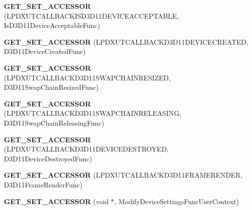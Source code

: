 \begin{DoxyCompactItemize}
\item 
\hypertarget{class_d_x_u_t_state_a4775782896fcfa945881eff26445830c}{{\bfseries G\+E\+T\+\_\+\+S\+E\+T\+\_\+\+A\+C\+C\+E\+S\+S\+O\+R} (L\+P\+D\+X\+U\+T\+C\+A\+L\+L\+B\+A\+C\+K\+I\+S\+D3\+D11\+D\+E\+V\+I\+C\+E\+A\+C\+C\+E\+P\+T\+A\+B\+L\+E, Is\+D3\+D11\+Device\+Acceptable\+Func)}\label{class_d_x_u_t_state_a4775782896fcfa945881eff26445830c}

\item 
\hypertarget{class_d_x_u_t_state_a305bd5b6f340358d358eb1ba0136b784}{{\bfseries G\+E\+T\+\_\+\+S\+E\+T\+\_\+\+A\+C\+C\+E\+S\+S\+O\+R} (L\+P\+D\+X\+U\+T\+C\+A\+L\+L\+B\+A\+C\+K\+D3\+D11\+D\+E\+V\+I\+C\+E\+C\+R\+E\+A\+T\+E\+D, D3\+D11\+Device\+Created\+Func)}\label{class_d_x_u_t_state_a305bd5b6f340358d358eb1ba0136b784}

\item 
\hypertarget{class_d_x_u_t_state_aa3917d0ad7c1d620158a0b9a5430c794}{{\bfseries G\+E\+T\+\_\+\+S\+E\+T\+\_\+\+A\+C\+C\+E\+S\+S\+O\+R} (L\+P\+D\+X\+U\+T\+C\+A\+L\+L\+B\+A\+C\+K\+D3\+D11\+S\+W\+A\+P\+C\+H\+A\+I\+N\+R\+E\+S\+I\+Z\+E\+D, D3\+D11\+Swap\+Chain\+Resized\+Func)}\label{class_d_x_u_t_state_aa3917d0ad7c1d620158a0b9a5430c794}

\item 
\hypertarget{class_d_x_u_t_state_a01d21b3d56f85cd0accb4727c5272405}{{\bfseries G\+E\+T\+\_\+\+S\+E\+T\+\_\+\+A\+C\+C\+E\+S\+S\+O\+R} (L\+P\+D\+X\+U\+T\+C\+A\+L\+L\+B\+A\+C\+K\+D3\+D11\+S\+W\+A\+P\+C\+H\+A\+I\+N\+R\+E\+L\+E\+A\+S\+I\+N\+G, D3\+D11\+Swap\+Chain\+Releasing\+Func)}\label{class_d_x_u_t_state_a01d21b3d56f85cd0accb4727c5272405}

\item 
\hypertarget{class_d_x_u_t_state_aaf058c9c904ee8328a3c7308cebdd977}{{\bfseries G\+E\+T\+\_\+\+S\+E\+T\+\_\+\+A\+C\+C\+E\+S\+S\+O\+R} (L\+P\+D\+X\+U\+T\+C\+A\+L\+L\+B\+A\+C\+K\+D3\+D11\+D\+E\+V\+I\+C\+E\+D\+E\+S\+T\+R\+O\+Y\+E\+D, D3\+D11\+Device\+Destroyed\+Func)}\label{class_d_x_u_t_state_aaf058c9c904ee8328a3c7308cebdd977}

\item 
\hypertarget{class_d_x_u_t_state_a79452c9869b633e792be85665a99a9ec}{{\bfseries G\+E\+T\+\_\+\+S\+E\+T\+\_\+\+A\+C\+C\+E\+S\+S\+O\+R} (L\+P\+D\+X\+U\+T\+C\+A\+L\+L\+B\+A\+C\+K\+D3\+D11\+F\+R\+A\+M\+E\+R\+E\+N\+D\+E\+R, D3\+D11\+Frame\+Render\+Func)}\label{class_d_x_u_t_state_a79452c9869b633e792be85665a99a9ec}

\item 
\hypertarget{class_d_x_u_t_state_a5a076c00ff8b66a490d7dd6036df0e46}{{\bfseries G\+E\+T\+\_\+\+S\+E\+T\+\_\+\+A\+C\+C\+E\+S\+S\+O\+R} (void $\ast$, Modify\+Device\+Settings\+Func\+User\+Context)}\label{class_d_x_u_t_state_a5a076c00ff8b66a490d7dd6036df0e46}


\end{DoxyCompactItemize}
